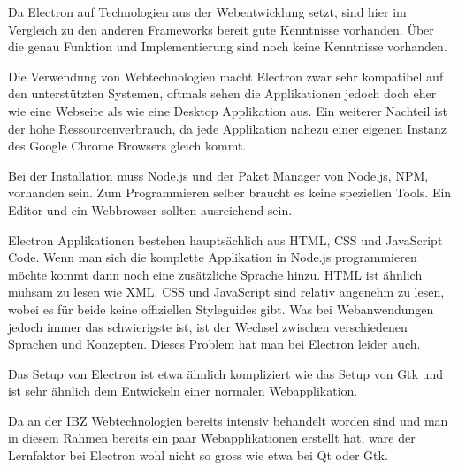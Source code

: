 Da Electron auf Technologien aus der Webentwicklung setzt, sind hier im
Vergleich zu den anderen Frameworks bereit gute Kenntnisse vorhanden. Über die
genau Funktion und Implementierung sind noch keine Kenntnisse vorhanden.

Die Verwendung von Webtechnologien macht Electron zwar sehr kompatibel auf den
unterstützten Systemen, oftmals sehen die Applikationen jedoch doch eher wie
eine Webseite als wie eine Desktop Applikation aus. Ein weiterer Nachteil ist
der hohe Ressourcenverbrauch, da jede Applikation nahezu einer eigenen Instanz
des Google Chrome Browsers gleich kommt.

Bei der Installation muss Node.js und der Paket Manager von Node.js, NPM,
vorhanden sein. Zum Programmieren selber braucht es keine speziellen Tools. Ein
Editor und ein Webbrowser sollten ausreichend sein.

Electron Applikationen bestehen hauptsächlich aus HTML, CSS und JavaScript
Code. Wenn man sich die komplette Applikation in Node.js programmieren möchte
kommt dann noch eine zusätzliche Sprache hinzu. HTML ist ähnlich mühsam zu
lesen wie XML. CSS und JavaScript sind relativ angenehm zu lesen, wobei es für
beide keine offiziellen Styleguides gibt. Was bei Webanwendungen jedoch immer
das schwierigste ist, ist der Wechsel zwischen verschiedenen Sprachen und
Konzepten. Dieses Problem hat man bei Electron leider auch.

Das Setup von Electron ist etwa ähnlich kompliziert wie das Setup von Gtk und
ist sehr ähnlich dem Entwickeln einer normalen Webapplikation.

Da an der IBZ Webtechnologien bereits intensiv behandelt worden sind und man in
diesem Rahmen bereits ein paar Webapplikationen erstellt hat, wäre der
Lernfaktor bei Electron wohl nicht so gross wie etwa bei Qt oder Gtk.


